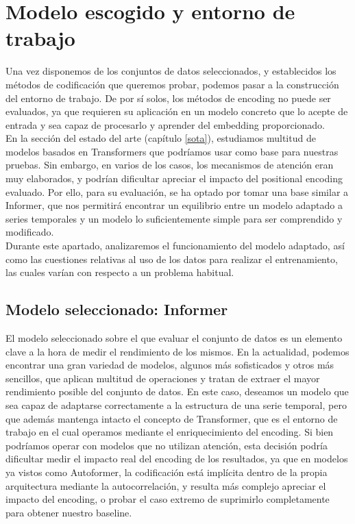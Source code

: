 \chapter{Modelo escogido y entorno de trabajo}

Una vez disponemos de los conjuntos de datos seleccionados, y establecidos los métodos de codificación que queremos probar, podemos pasar a la construcción del entorno de trabajo. De por sí solos, los métodos de encoding no puede ser evaluados, ya que requieren su aplicación en un modelo concreto que lo acepte de entrada y sea capaz de procesarlo y aprender del embedding proporcionado.\\

En la sección del estado del arte (capítulo \ref{sota}), estudiamos multitud de modelos basados en Transformers que podríamos usar como base para nuestras pruebas. Sin embargo, en varios de los casos, los mecanismos de atención eran muy elaborados, y podrían dificultar apreciar el impacto del positional encoding evaluado. Por ello, para su evaluación, se ha optado por tomar una base similar a Informer, que nos permitirá encontrar un equilibrio entre un modelo adaptado a series temporales y un modelo lo suficientemente simple para ser comprendido y modificado.\\

Durante este apartado, analizaremos el funcionamiento del modelo adaptado, así como las cuestiones relativas al uso de los datos para realizar el entrenamiento, las cuales varían con respecto a un problema habitual.

\section{Modelo seleccionado: Informer}

El modelo seleccionado sobre el que evaluar el conjunto de datos es un elemento clave a la hora de medir el rendimiento de los mismos. En la actualidad, podemos encontrar una gran variedad de modelos, algunos más sofisticados y otros más sencillos, que aplican multitud de operaciones y tratan de extraer el mayor rendimiento posible del conjunto de datos. En este caso, deseamos un modelo que sea capaz de adaptarse correctamente a la estructura de una serie temporal, pero que además mantenga intacto el concepto de Transformer, que es el entorno de trabajo en el cual operamos mediante el enriquecimiento del encoding. Si bien podríamos operar con modelos que no utilizan atención, esta decisión podría dificultar medir el impacto real del encoding de los resultados, ya que en modelos ya vistos como Autoformer, la codificación está implícita dentro de la propia arquitectura mediante la autocorrelación, y resulta más complejo apreciar el impacto del encoding, o probar el caso extremo de suprimirlo completamente para obtener nuestro baseline.\\

